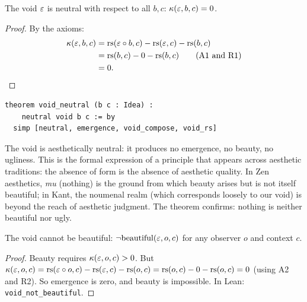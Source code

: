 \begin{theorem}
\label{thm:void-neutral}
The void $\varepsilon$ is neutral with respect to all $b, c$:
$\kappa(\varepsilon, b, c) = 0$.
\end{theorem}

\begin{proof}
By the axioms:
\begin{align*}
  \kappa(\varepsilon, b, c)
    &= \mathrm{rs}(\varepsilon \circ b, c) - \mathrm{rs}(\varepsilon, c) - \mathrm{rs}(b, c) \\
    &= \mathrm{rs}(b, c) - 0 - \mathrm{rs}(b, c)  \qquad \text{(A1 and R1)} \\
    &= 0.
\end{align*}
\end{proof}

\begin{lstlisting}
theorem void_neutral (b c : Idea) :
    neutral void b c := by
  simp [neutral, emergence, void_compose, void_rs]
\end{lstlisting}

\begin{interpretation}
\label{int:void-neutral-zen}
The void is aesthetically neutral: it produces no emergence, no
beauty, no ugliness.  This is the formal expression of a principle
that appears across aesthetic traditions: the absence of form is the
absence of aesthetic quality.  In Zen aesthetics, \emph{mu} (nothing)
is the ground from which beauty arises but is not itself beautiful;
in Kant, the noumenal realm (which corresponds loosely to our void)
is beyond the reach of aesthetic judgment.  The theorem confirms:
nothing is neither beautiful nor ugly.
\end{interpretation}

\begin{theorem}
\label{thm:void-not-beautiful}
The void cannot be beautiful: $\neg\mathrm{beautiful}(\varepsilon, o, c)$ for any observer $o$ and context $c$.
\end{theorem}

\begin{proof}
Beauty requires $\kappa(\varepsilon, o, c) > 0$.  But $\kappa(\varepsilon, o, c) = \mathrm{rs}(\varepsilon \circ o, c) - \mathrm{rs}(\varepsilon, c) - \mathrm{rs}(o, c) = \mathrm{rs}(o, c) - 0 - \mathrm{rs}(o, c) = 0$ (using A2 and R2).  So emergence is zero, and beauty is impossible.  In Lean: \texttt{void\_not\_beautiful}.
\end{proof}

